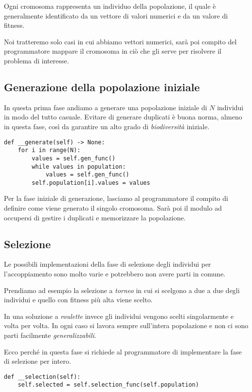 Ogni cromosoma rappresenta un individuo della popolazione, il quale è
generalmente identificato da un vettore di valori numerici e da un valore di
fitness.

Noi tratteremo solo casi in cui abbiamo vettori numerici, sarà poi compito del
programmatore mappare il cromosoma in ciò che gli serve per risolvere il
problema di interesse.

\subsection{Generazione della popolazione iniziale}

In questa prima fase andiamo a generare una popolazione iniziale di $N$
individui in modo del tutto casuale. Evitare di generare duplicati è buona
norma, almeno in questa fase, così da garantire un alto grado di
\emph{biodiversità} iniziale.

\begin{verbatim}
def __generate(self) -> None:
	for i in range(N):
		values = self.gen_func()
		while values in population:
			values = self.gen_func()
		self.population[i].values = values
\end{verbatim}

Per la fase iniziale di generazione, lasciamo al programmatore il compito di
definire come viene generato il singolo cromosoma. Sarà poi il modulo ad
occupersi di gestire i duplicati e memorizzare la popolazione.

\subsection{Selezione}

Le possibili implementazioni della fase di selezione degli individui per
l'accoppiamento sono molto varie e potrebbero non avere parti in comune.

Prendiamo ad esempio la selezione a \emph{torneo} in cui si scelgono a due a
due degli individui e quello con fitness più alta viene scelto.

In una soluzione a \emph{roulette} invece gli individui vengono scelti
singolarmente e volta per volta. In ogni caso si lavora sempre sull'intera
popolazione e non ci sono parti facilmente \emph{generalizzabili}.

Ecco perché in questa fase si richiede al programmatore di implementare la fase
di selezione per intero.

\begin{verbatim}
def __selection(self):
	self.selected = self.selection_func(self.population)
\end{verbatim}

